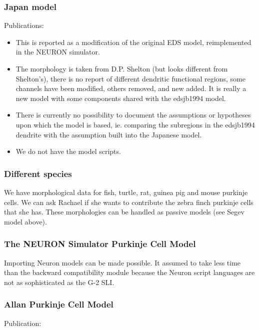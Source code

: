 \documentclass[12pt]{article}
\begin{document}
\subsubsection{Japan model}

Publications:~\cite{chono03:_purkin}\cite{miyasho01:_low_ca2_purkin}

\begin{itemize}
\item This is reported as a modification of the original EDS model,
  reimplemented in the NEURON simulator.
\item The morphology is taken from D.P. Shelton (but looks different
  from Shelton's), there is no report of different dendritic
  functional regions, some channels have been modified, others
  removed, and new added.  It is really a new model with some
  components shared with the edsjb1994 model.
\item There is currently no possibility to document the assumptions or
  hypotheses upon which the model is based, ie. comparing the
  subregions in the edsjb1994 dendrite with the assumption built into
  the Japanese model.
\item We do not have the model scripts.
\end{itemize}

\subsubsection{Different species}

We have morphological data for fish, turtle, rat, guinea pig and mouse
purkinje cells.  We can ask Rachael if she wants to contribute the
zebra finch purkinje cells that she has.  These morphologies can be
handled as passive models (see Segev model above).


\subsubsection{The NEURON Simulator Purkinje Cell Model}
Importing Neuron models can be made possible.  It assumed to take less
time than the backward compatibility module because the Neuron script
languages are not as sophisticated as the G-2 SLI.

\subsubsection{Allan Purkinje Cell Model}

Publication:~\cite{coop01}
\end{document}
